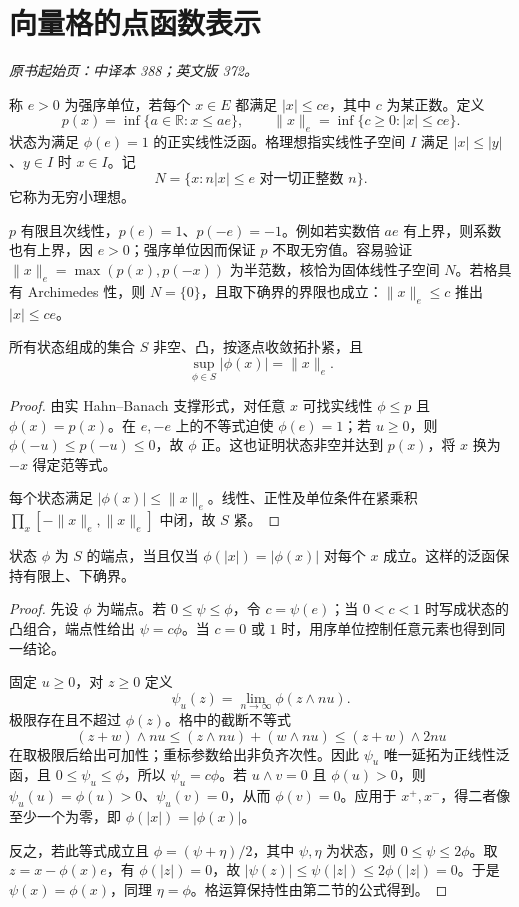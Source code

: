 \section{向量格的点函数表示}\label{sec:yosida-12-05}
\noindent\textit{原书起始页：中译本 388；英文版 372。}

\begin{definition}
称 $e>0$ 为强序单位，若每个 $x\in E$ 都满足 $|x|\le ce$，其中 $c$ 为某正数。定义
\[
 p(x)=\inf\{a\in\mathbb R:x\le ae\},\qquad
 \|x\|_e=\inf\{c\ge0:|x|\le ce\}.
\]
状态为满足 $\phi(e)=1$ 的正实线性泛函。格理想指实线性子空间 $I$ 满足 $|x|\le|y|$、$y\in I$ 时 $x\in I$。记
\[
 N=\{x:n|x|\le e\text{ 对一切正整数 }n\}.
\]
它称为无穷小理想。
\end{definition}

$p$ 有限且次线性，$p(e)=1$、$p(-e)=-1$。例如若实数倍 $ae$ 有上界，则系数也有上界，因 $e>0$；强序单位因而保证 $p$ 不取无穷值。容易验证 $\|x\|_e=\max(p(x),p(-x))$ 为半范数，核恰为固体线性子空间 $N$。若格具有 Archimedes 性，则 $N=\{0\}$，且取下确界的界限也成立：$\|x\|_e\le c$ 推出 $|x|\le ce$。

\begin{lemma}[状态的紧性与定范性]\label{lem:y12-states}
所有状态组成的集合 $S$ 非空、凸，按逐点收敛拓扑紧，且
\[
 \sup_{\phi\in S}|\phi(x)|=\|x\|_e.
\]
\end{lemma}
\begin{proof}
由实 Hahn--Banach 支撑形式，对任意 $x$ 可找实线性 $\phi\le p$ 且 $\phi(x)=p(x)$。在 $e,-e$ 上的不等式迫使 $\phi(e)=1$；若 $u\ge0$，则 $\phi(-u)\le p(-u)\le0$，故 $\phi$ 正。这也证明状态非空并达到 $p(x)$，将 $x$ 换为 $-x$ 得定范等式。

每个状态满足 $|\phi(x)|\le\|x\|_e$。线性、正性及单位条件在紧乘积 $\prod_x[-\|x\|_e,\|x\|_e]$ 中闭，故 $S$ 紧。
\end{proof}

\begin{lemma}[端状态恰为格同态]\label{lem:y12-extreme-states}
状态 $\phi$ 为 $S$ 的端点，当且仅当 $\phi(|x|)=|\phi(x)|$ 对每个 $x$ 成立。这样的泛函保持有限上、下确界。
\end{lemma}
\begin{proof}
先设 $\phi$ 为端点。若 $0\le\psi\le\phi$，令 $c=\psi(e)$；当 $0<c<1$ 时写成状态的凸组合，端点性给出 $\psi=c\phi$。当 $c=0$ 或 $1$ 时，用序单位控制任意元素也得到同一结论。

固定 $u\ge0$，对 $z\ge0$ 定义
\[
 \psi_u(z)=\lim_{n\to\infty}\phi(z\wedge nu).
\]
极限存在且不超过 $\phi(z)$。格中的截断不等式
\[
 (z+w)\wedge nu\le(z\wedge nu)+(w\wedge nu)
 \le(z+w)\wedge2nu
\]
在取极限后给出可加性；重标参数给出非负齐次性。因此 $\psi_u$ 唯一延拓为正线性泛函，且 $0\le\psi_u\le\phi$，所以 $\psi_u=c\phi$。若 $u\wedge v=0$ 且 $\phi(u)>0$，则 $\psi_u(u)=\phi(u)>0$、$\psi_u(v)=0$，从而 $\phi(v)=0$。应用于 $x^+,x^-$，得二者像至少一个为零，即 $\phi(|x|)=|\phi(x)|$。

反之，若此等式成立且 $\phi=(\psi+\eta)/2$，其中 $\psi,\eta$ 为状态，则 $0\le\psi\le2\phi$。取 $z=x-\phi(x)e$，有 $\phi(|z|)=0$，故 $|\psi(z)|\le\psi(|z|)\le2\phi(|z|)=0$。于是 $\psi(x)=\phi(x)$，同理 $\eta=\phi$。格运算保持性由第二节的公式得到。
\end{proof}

